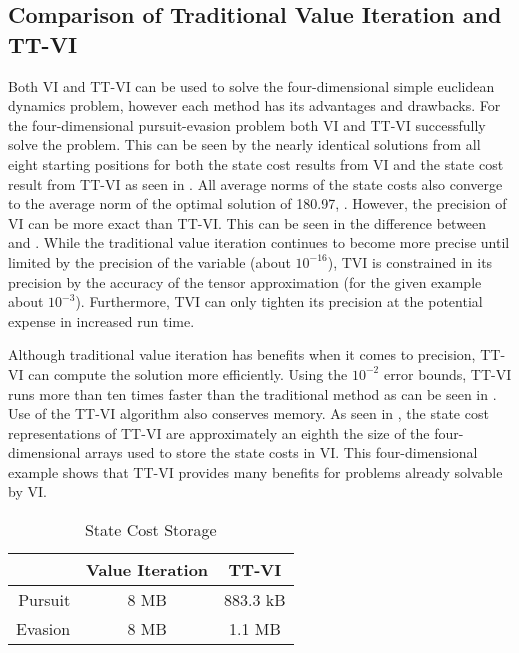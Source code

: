 \subsection{Comparison of Traditional Value Iteration and TT-VI}
Both VI and TT-VI can be used to solve the four-dimensional simple euclidean dynamics problem, however each method has its advantages and drawbacks. For the four-dimensional pursuit-evasion problem both VI and TT-VI successfully solve the problem. This can be seen by the nearly identical solutions from all eight starting positions for both the state cost results from VI and the state cost result from TT-VI as seen in . All average norms of the state costs also converge to the average norm of the optimal solution of 180.97, . However, the precision of VI can be more exact than TT-VI. This can be seen in the difference between  and . While the traditional value iteration continues to become more precise until limited by the precision of the variable (about $10^{-16}$), TVI is constrained in its precision by the accuracy of the tensor approximation (for the given example about $10^{-3}$). Furthermore, TVI can only tighten its precision at the potential expense in increased run time. 

Although traditional value iteration has benefits when it comes to precision, TT-VI can compute the solution more efficiently. Using the $10^{-2}$ error bounds, TT-VI runs more than ten times faster than the traditional method as can be seen in . Use of the TT-VI algorithm also conserves memory. As seen in , the state cost representations of TT-VI are approximately an eighth the size of the four-dimensional arrays used to store the state costs in VI. This four-dimensional example shows that TT-VI provides many benefits for problems already solvable by VI.
\begin{table}
\caption{State Cost Storage}
\label{4Dstore}
\begin{center}
\begin{tabular}{|r|c|c|}\hline
  & Value Iteration & TT-VI \\\hline
Pursuit & 8 MB & 883.3 kB \\\hline
Evasion & 8 MB & 1.1 MB \\\hline
\end{tabular}
\end{center}
\end{table}

